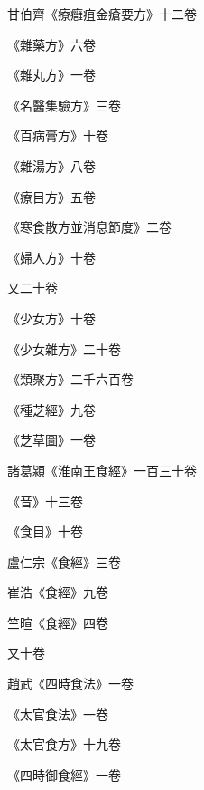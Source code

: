 \begin{pinyinscope}
 甘伯齊《療癰疽金瘡要方》十二卷



 《雜藥方》六卷



 《雜丸方》一卷



 《名醫集驗方》三卷



 《百病膏方》十卷



 《雜湯方》八卷



 《療目方》五卷



 《寒食散方並消息節度》二卷



 《婦人方》十卷



 又二十卷



 《少女方》十卷



 《少女雜方》二十卷



 《類聚方》二千六百卷



 《種芝經》九卷



 《芝草圖》一卷



 諸葛潁《淮南王食經》一百三十卷



 《音》十三卷



 《食目》十卷



 盧仁宗《食經》三卷



 崔浩《食經》九卷



 竺暄《食經》四卷



 又十卷



 趙武《四時食法》一卷



 《太官食法》一卷



 《太官食方》十九卷



 《四時御食經》一卷




\end{pinyinscope}
